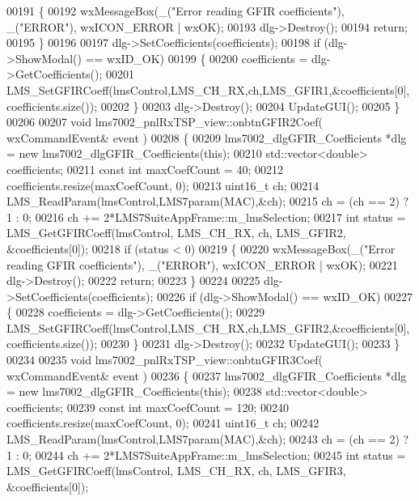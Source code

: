 \begin{DoxyCode}
{{{00191     \{
00192         wxMessageBox(\_(\textcolor{stringliteral}{"Error reading GFIR coefficients"}), \_(\textcolor{stringliteral}{"ERROR"}), wxICON\_ERROR | wxOK);
00193         dlg->Destroy();
00194         \textcolor{keywordflow}{return};
00195     \}
00196 
00197     dlg->SetCoefficients(coefficients);
00198     \textcolor{keywordflow}{if} (dlg->ShowModal() == wxID\_OK)
00199     \{
00200         coefficients = dlg->GetCoefficients();
00201         LMS_SetGFIRCoeff(lmsControl,LMS_CH_RX,ch,LMS_GFIR1,&coefficients[0],coefficients.size());
00202     \}
00203     dlg->Destroy();
00204     UpdateGUI();
00205 \}
00206 
00207 \textcolor{keywordtype}{void} lms7002_pnlRxTSP_view::onbtnGFIR2Coef( wxCommandEvent& event )
00208 \{
00209     lms7002_dlgGFIR_Coefficients *dlg = \textcolor{keyword}{new} lms7002_dlgGFIR_Coefficients(\textcolor{keyword}{this});
00210     std::vector<double> coefficients;
00211     \textcolor{keyword}{const} \textcolor{keywordtype}{int} maxCoefCount = 40;
00212     coefficients.resize(maxCoefCount, 0);
00213     uint16\_t ch;
00214     LMS_ReadParam(lmsControl,LMS7param(MAC),&ch);
00215     ch = (ch == 2) ? 1 : 0;
00216     ch += 2*LMS7SuiteAppFrame::m_lmsSelection;
00217     \textcolor{keywordtype}{int} status =  LMS_GetGFIRCoeff(lmsControl, LMS_CH_RX, ch, LMS_GFIR2, &coefficients[0]);
00218     \textcolor{keywordflow}{if} (status < 0)
00219     \{
00220         wxMessageBox(\_(\textcolor{stringliteral}{"Error reading GFIR coefficients"}), \_(\textcolor{stringliteral}{"ERROR"}), wxICON\_ERROR | wxOK);
00221         dlg->Destroy();
00222         \textcolor{keywordflow}{return};
00223     \}
00224 
00225     dlg->SetCoefficients(coefficients);
00226     \textcolor{keywordflow}{if} (dlg->ShowModal() == wxID\_OK)
00227     \{
00228         coefficients = dlg->GetCoefficients();
00229         LMS_SetGFIRCoeff(lmsControl,LMS_CH_RX,ch,LMS_GFIR2,&coefficients[0],coefficients.size());
00230     \}
00231     dlg->Destroy();
00232     UpdateGUI();
00233 \}
00234 
00235 \textcolor{keywordtype}{void} lms7002_pnlRxTSP_view::onbtnGFIR3Coef( wxCommandEvent& event )
00236 \{
00237     lms7002_dlgGFIR_Coefficients *dlg = \textcolor{keyword}{new} lms7002_dlgGFIR_Coefficients(\textcolor{keyword}{this});
00238     std::vector<double> coefficients;
00239     \textcolor{keyword}{const} \textcolor{keywordtype}{int} maxCoefCount = 120;
00240     coefficients.resize(maxCoefCount, 0);
00241     uint16\_t ch;
00242     LMS_ReadParam(lmsControl,LMS7param(MAC),&ch);
00243     ch = (ch == 2) ? 1 : 0;
00244     ch += 2*LMS7SuiteAppFrame::m_lmsSelection;
00245     \textcolor{keywordtype}{int} status =  LMS_GetGFIRCoeff(lmsControl, LMS_CH_RX, ch, LMS_GFIR3, &coefficients[0]);
}}}
\end{DoxyCode}

